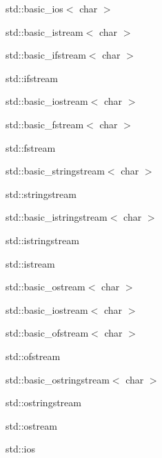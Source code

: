 \begin{CompactList}
\begin{CompactList}
\begin{CompactList}
\end{CompactList}
\item std::basic\_\-ios$<$ char $>$\begin{CompactList}
\item std::basic\_\-istream$<$ char $>$\begin{CompactList}
\item std::basic\_\-ifstream$<$ char $>$\begin{CompactList}
\item std::ifstream\end{CompactList}
\item std::basic\_\-iostream$<$ char $>$\begin{CompactList}
\item std::basic\_\-fstream$<$ char $>$\begin{CompactList}
\item std::fstream\end{CompactList}
\item std::basic\_\-stringstream$<$ char $>$\begin{CompactList}
\item std::stringstream\end{CompactList}
\end{CompactList}
\item std::basic\_\-istringstream$<$ char $>$\begin{CompactList}
\item std::istringstream\end{CompactList}
\item std::istream\end{CompactList}
\item std::basic\_\-ostream$<$ char $>$\begin{CompactList}
\item std::basic\_\-iostream$<$ char $>$\item std::basic\_\-ofstream$<$ char $>$\begin{CompactList}
\item std::ofstream\end{CompactList}
\item std::basic\_\-ostringstream$<$ char $>$\begin{CompactList}
\item std::ostringstream\end{CompactList}
\item std::ostream\end{CompactList}
\item std::ios\end{CompactList}

\end{CompactList}
\end{CompactList}
